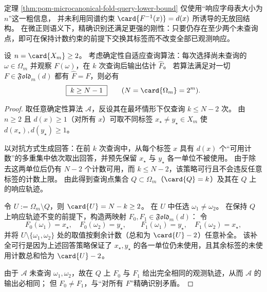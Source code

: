 \begin{remark}[计数下界与查询刚性]
定理 \ref{thm:pom-microcanonical-fold-query-lower-bound} 仅使用“响应字母表大小为 \(n\)”这一粗信息，
并未利用同谱约束 \(\card{F^{-1}(x)}=d(x)\) 所诱导的无放回结构。
在微正则语义下，精确识别还满足更强的刚性：只要仍存在至少两个未查询点，即可在保持计数约束的前提下交换其标签而不改变全部已观测响应。
\end{remark}

\begin{theorem}\label{thm:pom-microcanonical-fold-worstcase-query-rigidity}
设 \(n=\card{X_m}\ge 2\)。
考虑确定性自适应查询算法：每次选择尚未查询的 \(\omega\in\Omega_m\) 并观察 \(F(\omega)\)，在 \(k\) 次查询后输出估计 \(\widehat F\)。
若算法满足对一切 \(F\in\mathfrak{Fold}_m(d)\) 都有 \(\widehat F=F\)，则必有
\[
\boxed{\;k\ge N-1\;}
\qquad(N=\card{\Omega_m}=2^m).
\]
\end{theorem}
\begin{proof}
取任意确定性算法 \(\mathcal{A}\)，反设其在最坏情形下仅查询 \(k\le N-2\) 次。
由 \(n\ge 2\) 且 \(d(x)\ge 1\)（对所有 \(x\)）可取不同标签 \(x_\star\neq y_\star\in X_m\) 使 \(d(x_\star),d(y_\star)\ge 1\)。
\par
以对抗方式生成回答：在前 \(k\) 次查询中，从每个标签 \(x\) 具有 \(d(x)\) 个“可用计数”的多重集中依次取出回答，并预先保留 \(x_\star\) 与 \(y_\star\) 各一单位不被使用。
由于除去这两单位后仍有 \(N-2\) 个计数可用，而 \(k\le N-2\)，该策略可行且不会违反任意标签的计数上限。
由此得到查询点集合 \(Q\subset\Omega_m\)（\(\card{Q}=k\)）及其在 \(Q\) 上的响应轨迹。
\par
令 \(U:=\Omega_m\setminus Q\)，则 \(\card{U}=N-k\ge 2\)。
在 \(U\) 中任选 \(\omega_1\neq\omega_2\)。
在保持 \(Q\) 上响应轨迹不变的前提下，构造两映射 \(F_0,F_1\in\mathfrak{Fold}_m(d)\)：
令
\[
F_0(\omega_1)=x_\star,\quad F_0(\omega_2)=y_\star,\qquad
F_1(\omega_1)=y_\star,\quad F_1(\omega_2)=x_\star,
\]
并将 \(U\setminus\{\omega_1,\omega_2\}\) 处的取值按剩余计数（总和为 \(\card{U}-2\)）任意补全。
该补全可行是因为上述回答策略保证了 \(x_\star,y_\star\) 的各一单位仍未使用，且其余标签的未使用计数总和恰为 \(\card{U}-2\)。
\par
由于 \(\mathcal{A}\) 未查询 \(\omega_1,\omega_2\)，故在 \(Q\) 上 \(F_0\) 与 \(F_1\) 给出完全相同的观测轨迹，从而 \(\mathcal{A}\) 的输出必相同；
但 \(F_0\neq F_1\)，与“对所有 \(F\)”精确识别矛盾。
\end{proof}

